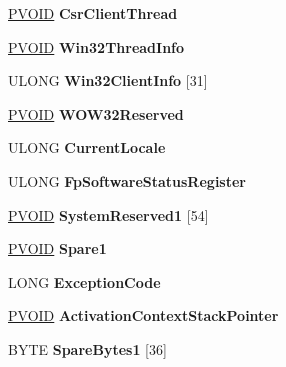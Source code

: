 \begin{DoxyCompactItemize}
\hyperlink{interfacevoid}{P\+V\+O\+ID} {\bfseries Csr\+Client\+Thread}
\item 
\mbox{\label{struct___t_e_b_a4e2a8d6ba72f0e443910cec539087673}} 
\hyperlink{interfacevoid}{P\+V\+O\+ID} {\bfseries Win32\+Thread\+Info}
\item 
\mbox{\label{struct___t_e_b_a265c47411589b1ca0aa6df76191baa76}} 
U\+L\+O\+NG {\bfseries Win32\+Client\+Info} \mbox{[}31\mbox{]}
\item 
\mbox{\label{struct___t_e_b_a202caa2e1aa0ca97f7bd910193aa0c54}} 
\hyperlink{interfacevoid}{P\+V\+O\+ID} {\bfseries W\+O\+W32\+Reserved}
\item 
\mbox{\label{struct___t_e_b_a3306c3d1494ca5ff89bca2c9232314e5}} 
U\+L\+O\+NG {\bfseries Current\+Locale}
\item 
\mbox{\label{struct___t_e_b_a31757f8142b07578f85d6ba18c51c0fb}} 
U\+L\+O\+NG {\bfseries Fp\+Software\+Status\+Register}
\item 
\mbox{\label{struct___t_e_b_a17355cbe6f1f5910dd85f1208e49a697}} 
\hyperlink{interfacevoid}{P\+V\+O\+ID} {\bfseries System\+Reserved1} \mbox{[}54\mbox{]}
\item 
\mbox{\label{struct___t_e_b_a59add76d411da5ce66bf71d7717308d2}} 
\hyperlink{interfacevoid}{P\+V\+O\+ID} {\bfseries Spare1}
\item 
\mbox{\label{struct___t_e_b_a4e62a0f8f5f6198d0de59b00a219b00e}} 
L\+O\+NG {\bfseries Exception\+Code}
\item 
\mbox{\label{struct___t_e_b_a2c8771bb8e617e1fcc49725f2d3ea0b5}} 
\hyperlink{interfacevoid}{P\+V\+O\+ID} {\bfseries Activation\+Context\+Stack\+Pointer}
\item 
\mbox{\label{struct___t_e_b_a1d684adea3c9f9fb1b5baae90b7bdb22}} 
B\+Y\+TE {\bfseries Spare\+Bytes1} \mbox{[}36\mbox{]}
\item 
\mbox{\label{struct___t_e_b_ae69c8c47168f14b2f5d7391140a6ed8c}} 

\end{DoxyCompactItemize}
